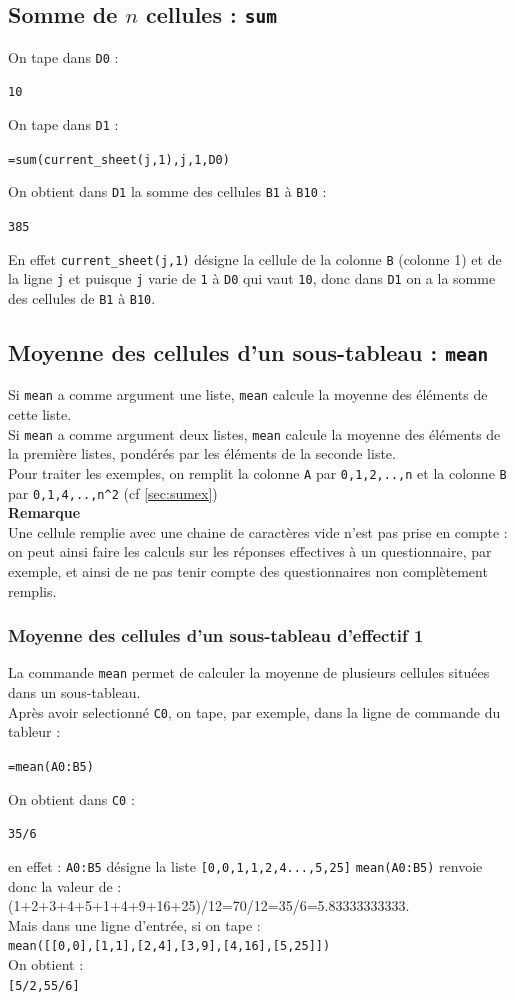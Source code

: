 \documentclass[a4paper,11pt]{book}
\begin{document}
\subsection{Somme de $n$ cellules : {\tt sum}}\label{sec:sum}
\noindent On tape dans {\tt D0} :
\begin{center}{\tt  10}\end{center}
On tape dans {\tt D1} :
\begin{center}{\tt =sum(current\_sheet(j,1),j,1,D0)}\end{center}
On obtient dans {\tt D1} la somme des cellules {\tt B1} \`a {\tt B10} :
\begin{center}{\tt 385}\end{center}
En effet {\tt current\_sheet(j,1)} d\'esigne la cellule de la colonne {\tt B} 
(colonne 1) et de la ligne {\tt j} et puisque {\tt j} varie de {\tt 1}
 \`a {\tt D0} qui vaut {\tt 10}, donc dans  
{\tt D1} on a la somme des cellules de {\tt B1} \`a {\tt B10}.
\subsection{Moyenne des cellules d'un sous-tableau : {\tt mean}}\label{sec:mean}
\noindent Si {\tt mean} a comme argument une liste, {\tt mean} calcule la
 moyenne des \'el\'ements de cette liste.\\
Si {\tt mean} a comme argument deux listes, {\tt mean} calcule la 
moyenne des \'el\'ements de la  premi\`ere listes, pond\'er\'es par les 
\'el\'ements de la seconde liste.\\
Pour traiter les exemples,  on remplit la colonne {\tt A} par 
{\tt 0,1,2,..,n} et la colonne 
{\tt B} par {\tt 0,1,4,..,n\verb|^|2} (cf \ref{sec:sumex})\\
{\bf Remarque}\\
Une cellule remplie avec une chaine de caract\`eres vide n'est pas prise en 
compte : on peut ainsi faire les calculs sur les r\'eponses effectives \`a un 
questionnaire, par exemple, et ainsi de ne pas tenir compte des questionnaires 
non compl\`etement remplis. 
\subsubsection{Moyenne des cellules d'un sous-tableau d'effectif 1}
La commande {\tt mean} permet de calculer la moyenne de plusieurs cellules
 situ\'ees dans un sous-tableau.\\
Apr\`es avoir selectionn\'e {\tt C0}, on tape, par exemple, dans la ligne de 
commande du tableur :
\begin{center}{\tt =mean(A0:B5)}\end{center}
On obtient dans {\tt C0} :
\begin{center}{\tt 35/6}\end{center}
en effet : {\tt A0:B5} d\'esigne la liste {\tt [0,0,1,1,2,4...,5,25]}
{\tt mean(A0:B5)} renvoie donc la valeur de :\\
 (1+2+3+4+5+1+4+9+16+25)/12=70/12=35/6=5.83333333333.\\
Mais dans une ligne d'entr\'ee, si on tape :\\
{\tt mean([[0,0],[1,1],[2,4],[3,9],[4,16],[5,25]])}\\
On obtient :\\
{\tt [5/2,55/6]}
\end{document}
